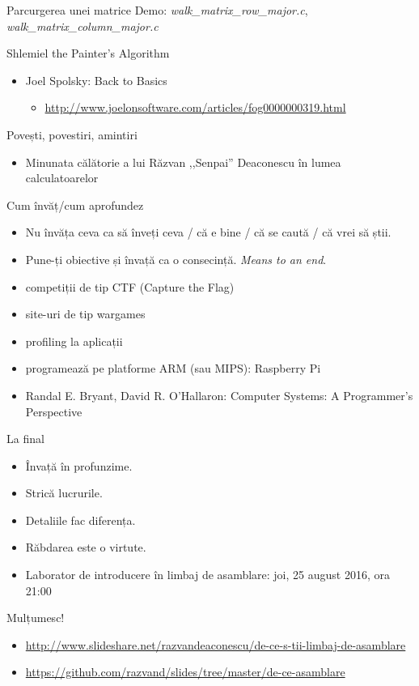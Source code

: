 \documentclass{beamer}
\begin{document}
\begin{frame}{Parcurgerea unei matrice}
  \centering
  Demo: \textit{walk\_matrix\_row\_major.c}, \textit{walk\_matrix\_column\_major.c}
\end{frame}

\begin{frame}{Shlemiel the Painter's Algorithm}
  \begin{itemize}
    \item Joel Spolsky: Back to Basics
      \begin{itemize}
        \item \footnotesize{\url{http://www.joelonsoftware.com/articles/fog0000000319.html}}
      \end{itemize}
  \end{itemize}
\end{frame}

\begin{frame}{Povești, povestiri, amintiri}
  \begin{itemize}
    \item Minunata călătorie a lui Răzvan ,,Senpai'' Deaconescu în lumea calculatoarelor
  \end{itemize}
\end{frame}

\begin{frame}{Cum învăț/cum aprofundez}
  \begin{itemize}
    \pause \item Nu învăța ceva ca să înveți ceva / că e bine / că se caută / că vrei să știi.
    \pause \item Pune-ți obiective și învață ca o consecință. \textit{Means to an end}.
    \pause \item competiții de tip CTF (Capture the Flag)
    \pause \item site-uri de tip wargames
    \pause \item profiling la aplicații
    \pause \item programează pe platforme ARM (sau MIPS): Raspberry Pi
    \pause \item Randal E. Bryant, David R. O'Hallaron: Computer Systems: A Programmer's Perspective
  \end{itemize}
\end{frame}

\begin{frame}{La final}
  \begin{itemize}
    \pause \item Învață în profunzime.
    \pause \item Strică lucrurile.
    \pause \item Detaliile fac diferența.
    \pause \item Răbdarea este o virtute.
    \pause \item Laborator de introducere în limbaj de asamblare: joi, 25 august 2016, ora 21:00
  \end{itemize}
\end{frame}

\begin{frame}{Mulțumesc!}
  \begin{itemize}
    \item \tiny{\url{http://www.slideshare.net/razvandeaconescu/de-ce-s-tii-limbaj-de-asamblare}}
    \item \tiny{\url{https://github.com/razvand/slides/tree/master/de-ce-asamblare}}
  \end{itemize}
\end{frame}
\end{document}
